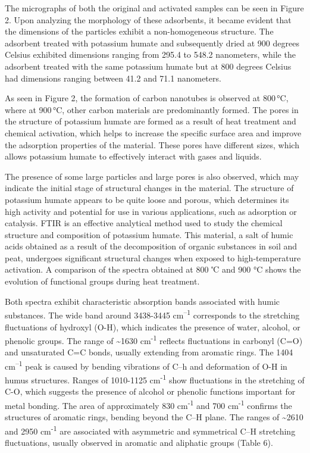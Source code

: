 \begin{multicols}{2}
The micrographs of both the original and activated samples can be seen
in Figure 2. Upon analyzing the morphology of these adsorbents, it
became evident that the dimensions of the particles exhibit a
non-homogeneous structure. The adsorbent treated with potassium humate
and subsequently dried at 900 degrees Celsius exhibited dimensions
ranging from 295.4 to 548.2 nanometers, while the adsorbent treated with
the same potassium humate but at 800 degrees Celsius had dimensions
ranging between 41.2 and 71.1 nanometers.

As seen in Figure 2, the formation of carbon nanotubes is observed at
800\,°C, where at 900\,°C, other carbon materials are predominantly
formed. The pores in the structure of potassium humate are formed as a
result of heat treatment and chemical activation, which helps to
increase the specific surface area and improve the adsorption properties
of the material. These pores have different sizes, which allows
potassium humate to effectively interact with gases and liquids.

The presence of some large particles and large pores is also observed,
which may indicate the initial stage of structural changes in the
material. The structure of potassium humate appears to be quite loose
and porous, which determines its high activity and potential for use in
various applications, such as adsorption or catalysis.
FTIR is an effective analytical method used to study the chemical
structure and composition of potassium humate. This material, a salt of
humic acids obtained as a result of the decomposition of organic
substances in soil and peat, undergoes significant structural changes
when exposed to high-temperature activation. A comparison of the spectra
obtained at 800 ℃ and 900 °C shows the evolution of functional groups
during heat treatment.

Both spectra exhibit characteristic absorption bands associated with
humic substances. The wide band around 3438-3445 cm\textsuperscript{--1}
corresponds to the stretching fluctuations of hydroxyl (O-H), which
indicates the presence of water, alcohol, or phenolic groups. The range
of \textasciitilde1630 cm\textsuperscript{-1} reflects fluctuations in
carbonyl (C=O) and unsaturated C=C bonds, usually extending from
aromatic rings. The 1404 cm\textsuperscript{--1} peak is caused by
bending vibrations of C--h and deformation of O-H in humus structures.
Ranges of 1010-1125 cm\textsuperscript{-1} show fluctuations in the
stretching of C-O, which suggests the presence of alcohol or phenolic
functions important for metal bonding. The area of approximately 830
cm\textsuperscript{-1} and 700 cm\textsuperscript{-1} confirms the
structures of aromatic rings, bending beyond the C--H plane. The ranges
of \textasciitilde2610 and 2950 cm\textsuperscript{-1} are associated
with asymmetric and symmetrical C--H stretching fluctuations, usually
observed in aromatic and aliphatic groups (Table 6).
\end{multicols}

